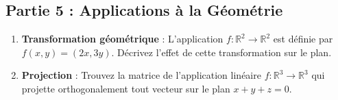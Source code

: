 \subsection*{Partie 5 : Applications à la Géométrie}
\begin{enumerate}
    \item \textbf{Transformation géométrique} : 
    L'application \( f : \mathbb{R}^2 \to \mathbb{R}^2 \) est définie par \( f(x, y) = (2x, 3y) \). Décrivez l'effet de cette transformation sur le plan.
    
    \item \textbf{Projection} : 
    Trouvez la matrice de l'application linéaire \( f : \mathbb{R}^3 \to \mathbb{R}^3 \) qui projette orthogonalement tout vecteur sur le plan \( x + y + z = 0 \).
\end{enumerate}
